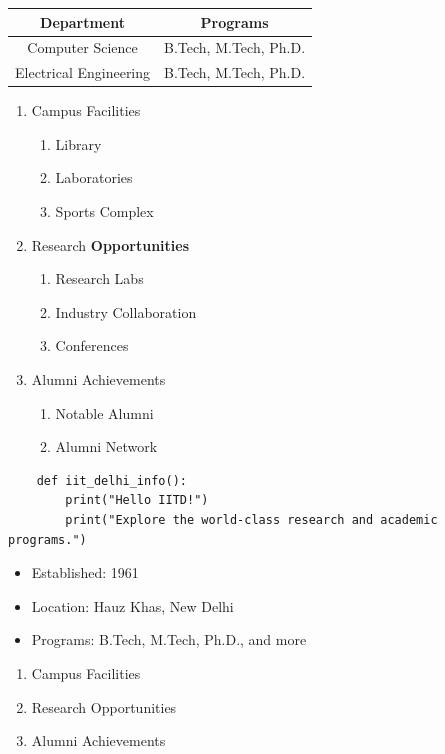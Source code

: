 \documentclass{article}
\begin{document}
\begin{tabular}{|c|c|}
\hline
Department & Programs \\
\hline
Computer Science & B.Tech, M.Tech, Ph.D. \\
Electrical Engineering & B.Tech, M.Tech, Ph.D. \\
\hline
\end{tabular}


\begin{enumerate}
    \item Campus Facilities
    \begin{enumerate}
        \item Library
        \item Laboratories
        \item Sports Complex
    \end{enumerate}
    \item Research \textbf{Opportunities}
    \begin{enumerate}
        \item Research Labs
        \item Industry Collaboration
        \item Conferences
    \end{enumerate}
    \item Alumni Achievements
    \begin{enumerate}
        \item Notable Alumni
        \item Alumni Network
    \end{enumerate}
\end{enumerate}



\begin{verbatim}
    def iit_delhi_info():
        print("Hello IITD!")
        print("Explore the world-class research and academic programs.")
\end{verbatim}


\begin{itemize}
    \item Established: 1961
    \item Location: Hauz Khas, New Delhi
    \item Programs: B.Tech, M.Tech, Ph.D., and more
\end{itemize}

\begin{enumerate}
    \item Campus Facilities
    \item Research Opportunities
    \item Alumni Achievements
\end{enumerate}
\end{document}

